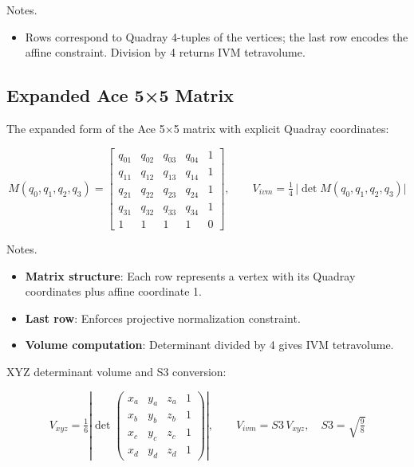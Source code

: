 \documentclass[
  10pt,
]{article}
\providecommand{\tightlist}{%
  \setlength{\itemsep}{0pt}\setlength{\parskip}{0pt}}
\begin{document}
Notes.

\begin{itemize}
\tightlist
\item
  Rows correspond to Quadray 4-tuples of the vertices; the last row
  encodes the affine constraint. Division by 4 returns IVM tetravolume.
\end{itemize}

\hypertarget{expanded-ace-55-matrix}{%
\subsection{Expanded Ace 5×5 Matrix}\label{expanded-ace-55-matrix}}

The expanded form of the Ace 5×5 matrix with explicit Quadray
coordinates:

\begin{equation}\label{eq:ace5x5_expanded}
M(q_0,q_1,q_2,q_3) = \begin{bmatrix}
q_{01} & q_{02} & q_{03} & q_{04} & 1 \\
q_{11} & q_{12} & q_{13} & q_{14} & 1 \\
q_{21} & q_{22} & q_{23} & q_{24} & 1 \\
q_{31} & q_{32} & q_{33} & q_{34} & 1 \\
1 & 1 & 1 & 1 & 0
\end{bmatrix}, \qquad V_{ivm} = \tfrac{1}{4}\,\big|\det M(q_0,q_1,q_2,q_3)\big|
\end{equation}

Notes.

\begin{itemize}
\tightlist
\item
  \textbf{Matrix structure}: Each row represents a vertex with its
  Quadray coordinates plus affine coordinate 1.
\item
  \textbf{Last row}: Enforces projective normalization constraint.
\item
  \textbf{Volume computation}: Determinant divided by 4 gives IVM
  tetravolume.
\end{itemize}

XYZ determinant volume and S3 conversion:

\begin{equation}\label{eq:xyz_det}
V_{xyz} = \tfrac{1}{6} \left| \det \begin{pmatrix}
 x_a & y_a & z_a & 1 \\
 x_b & y_b & z_b & 1 \\
 x_c & y_c & z_c & 1 \\
  x_d & y_d & z_d & 1
\end{pmatrix} \right|, \qquad V_{ivm} = S3\, V_{xyz},\quad S3=\sqrt{\tfrac{9}{8}}
\end{equation}
\end{document}
